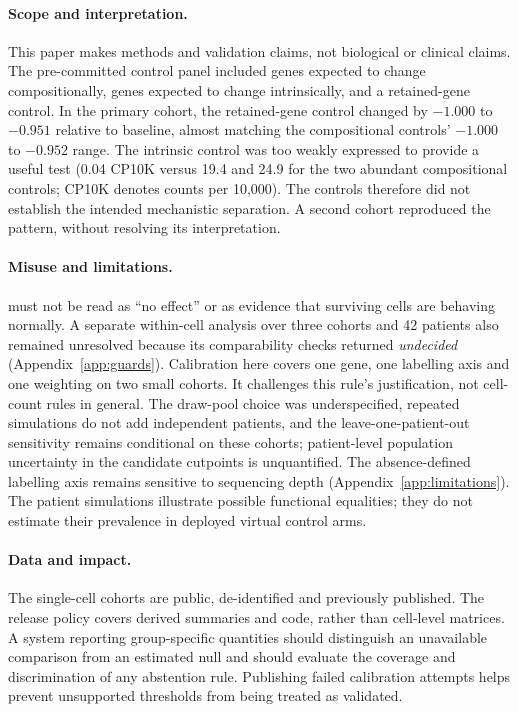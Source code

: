 \paragraph{Scope and interpretation.}
This paper makes methods and validation claims, not biological or clinical
claims. The pre-committed control panel included genes expected to change
compositionally, genes expected to change intrinsically, and a retained-gene
control. In the primary cohort, the retained-gene control changed by
$-1.000$ to $-0.951$ relative to baseline, almost matching the compositional
controls' $-1.000$ to $-0.952$ range. The intrinsic control was too weakly
expressed to provide a useful test (0.04 CP10K versus 19.4 and 24.9 for the two
abundant compositional controls; CP10K denotes counts per 10,000).
The controls therefore did not establish the intended mechanistic separation.
A second cohort reproduced the pattern, without resolving its interpretation.

\paragraph{Misuse and limitations.}
\notest{} must not be read as ``no effect'' or as evidence that surviving cells
are behaving normally. A separate within-cell analysis over three cohorts and
42 patients also remained unresolved because its comparability checks returned
\emph{undecided} (Appendix~\ref{app:guards}). Calibration here covers one gene,
one labelling axis and one weighting on two small cohorts. It challenges this
rule's justification, not cell-count rules in general. The draw-pool choice was
underspecified, repeated simulations do not add independent patients, and
the leave-one-patient-out sensitivity remains conditional on these cohorts;
patient-level population uncertainty in the candidate cutpoints is unquantified.
The absence-defined labelling axis remains sensitive to sequencing depth
(Appendix~\ref{app:limitations}). The patient simulations illustrate possible
functional equalities; they do not estimate their prevalence in deployed
virtual control arms.

\paragraph{Data and impact.}
The single-cell cohorts are public, de-identified and previously published.
The release policy covers derived summaries and code, rather than cell-level
matrices. A system reporting group-specific quantities should distinguish an
unavailable comparison from an estimated null and should evaluate the coverage
and discrimination of any abstention rule. Publishing failed calibration
attempts helps prevent unsupported thresholds from being treated as validated.
